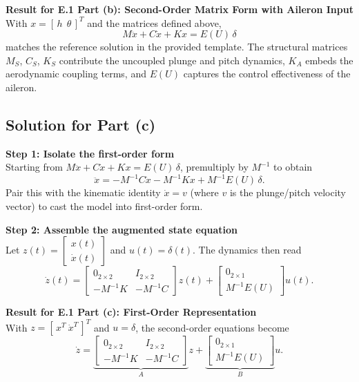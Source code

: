 \documentclass[12pt]{article}
\begin{document}
\begin{resultsbox}
\textbf{Result for E.1 Part (b): Second-Order Matrix Form with Aileron Input}\\[0.5em]
With $x = [\,h\ \ \theta\,]^T$ and the matrices defined above,
\[
  M\ddot{x} + C\dot{x} + K x = E(U)\,\delta
\]
matches the reference solution in the provided template. The structural matrices $M_S$, $C_S$, $K_S$ contribute the uncoupled plunge and pitch dynamics, $K_A$ embeds the aerodynamic coupling terms, and $E(U)$ captures the control effectiveness of the aileron.
\end{resultsbox}

\subsection*{Solution for Part (c)}

\begin{stepbox}
\textbf{Step 1: Isolate the first-order form}\\[0.5em]
Starting from $M\ddot{x} + C\dot{x} + Kx = E(U)\,\delta$, premultiply by $M^{-1}$ to obtain
\[
  \ddot{x} = -M^{-1} C \dot{x} - M^{-1} K x + M^{-1} E(U)\,\delta.
\]
Pair this with the kinematic identity $\dot{x} = v$ (where $v$ is the plunge/pitch velocity vector) to cast the model into first-order form.
\end{stepbox}

\begin{stepbox}
\textbf{Step 2: Assemble the augmented state equation}\\[0.5em]
Let $z(t) = \begin{bmatrix} x(t) \\ \dot{x}(t) \end{bmatrix}$ and $u(t) = \delta(t)$.  The dynamics then read
\[
  \dot{z}(t) =
  \begin{bmatrix}
    0_{2\times 2} & I_{2\times 2} \\
    -M^{-1}K & -M^{-1}C
  \end{bmatrix} z(t) +
  \begin{bmatrix}
    0_{2\times 1} \\
    M^{-1}E(U)
  \end{bmatrix} u(t).
\]
\end{stepbox}

\begin{resultsbox}
\textbf{Result for E.1 Part (c): First-Order Representation}\\[0.5em]
With $z = [\,x^T\ \dot{x}^T\,]^T$ and $u = \delta$, the second-order equations become
\[
  \dot{z} =
  \underbrace{\begin{bmatrix}
    0_{2\times 2} & I_{2\times 2} \\
    -M^{-1}K & -M^{-1}C
  \end{bmatrix}}_{A} z +
  \underbrace{\begin{bmatrix}
    0_{2\times 1} \\
    M^{-1}E(U)
  \end{bmatrix}}_{B} u.
\]
\end{resultsbox}
\end{document}
